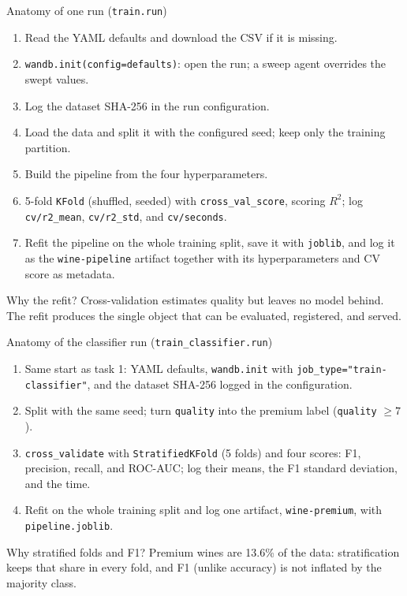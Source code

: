 \begin{frame}{Anatomy of one run (\texttt{train.run})}
\begin{enumerate}\footnotesize
\item Read the YAML defaults and download the CSV if it is missing.
\item \texttt{wandb.init(config=defaults)}: open the run; a sweep agent overrides the swept values.
\item Log the dataset SHA-256 in the run configuration.
\item Load the data and split it with the configured seed; keep only the training partition.
\item Build the pipeline from the four hyperparameters.
\item 5-fold \texttt{KFold} (shuffled, seeded) with \texttt{cross\_val\_score}, scoring $R^2$; log \texttt{cv/r2\_mean}, \texttt{cv/r2\_std}, and \texttt{cv/seconds}.
\item Refit the pipeline on the whole training split, save it with \texttt{joblib}, and log it as the \texttt{wine-pipeline} artifact together with its hyperparameters and CV score as metadata.
\end{enumerate}
\vspace{0.4em}
\begin{block}{Why the refit?}
\footnotesize Cross-validation estimates quality but leaves no model behind. The refit produces the single object that can be evaluated, registered, and served.
\end{block}
\coursefooter
\end{frame}

\begin{frame}{Anatomy of the classifier run (\texttt{train\_classifier.run})}
\begin{enumerate}\footnotesize
\item Same start as task 1: YAML defaults, \texttt{wandb.init} with \texttt{job\_type="train-classifier"}, and the dataset SHA-256 logged in the configuration.
\item Split with the same seed; turn \texttt{quality} into the premium label (\texttt{quality} $\ge 7$).
\item \texttt{cross\_validate} with \texttt{StratifiedKFold} (5 folds) and four scores: F1, precision, recall, and ROC-AUC; log their means, the F1 standard deviation, and the time.
\item Refit on the whole training split and log one artifact, \texttt{wine-premium}, with \texttt{pipeline.joblib}.
\end{enumerate}
\vspace{0.4em}
\begin{block}{Why stratified folds and F1?}
\footnotesize Premium wines are 13.6\% of the data: stratification keeps that share in every fold, and F1 (unlike accuracy) is not inflated by the majority class.
\end{block}
\coursefooter
\end{frame}

